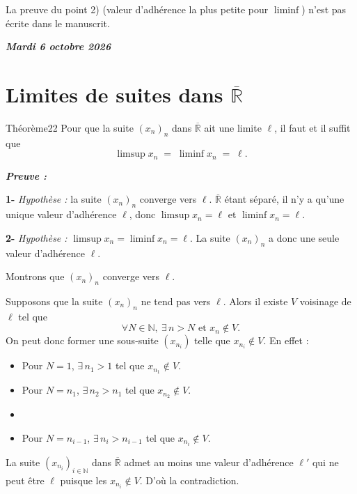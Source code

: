 \documentclass[11pt,a4paper]{article}
\newcommand{\N}{\mathbb{N}}
\newcommand{\Rb}{\overline{\mathbb{R}}}
\newenvironment{preuve}{\par\textit{\textbf{Preuve :}}\par\nopagebreak[4]}{\par}
\newcommand{\datepage}[1]{\begin{flushright}\small\bfseries\itshape\color{bleuclair}#1\end{flushright}\vspace{-8pt}}
\begin{document}
\begin{note}
La preuve du point 2) (valeur d'adhérence la plus petite pour $\liminf$) n'est pas écrite dans le manuscrit.
\end{note}


\datepage{Mardi 6 octobre 2026}
\section*{Limites de suites dans $\Rb$}

\begin{enonce}{Théorème}{22}
Pour que la suite $(x_n)_n$ dans $\Rb$ ait une limite $\ell$, il faut et il suffit que
\[
  \limsup x_n \;=\; \liminf x_n \;=\; \ell .
\]
\end{enonce}

\begin{preuve}\end{preuve}

\textbf{1-} \textit{Hypothèse :} la suite $(x_n)_n$ converge vers $\ell$.
$\Rb$ étant séparé, il n'y a qu'une unique valeur d'adhérence $\ell$,
donc $\limsup x_n=\ell$ et $\liminf x_n=\ell$.

\textbf{2-} \textit{Hypothèse :} $\limsup x_n=\liminf x_n=\ell$.
La suite $(x_n)_n$ a donc une seule valeur d'adhérence $\ell$.

Montrons que $(x_n)_n$ converge vers $\ell$.

Supposons que la suite $(x_n)_n$ ne tend pas vers $\ell$.
Alors il existe $V$ voisinage de $\ell$ tel que
\[
  \forall N\in\N,\ \exists\, n>N \text{ et } x_n\notin V .
\]
On peut donc former une sous-suite $(x_{n_i})$ telle que $x_{n_i}\notin V$. En effet :
\begin{itemize}[leftmargin=2cm,label={},itemsep=2pt]
  \item Pour $N=1$, $\exists\, n_1>1$ tel que $x_{n_1}\notin V$.
  \item Pour $N=n_1$, $\exists\, n_2>n_1$ tel que $x_{n_2}\notin V$.
  \item[\hspace{0.3cm}$\vdots$]
  \item Pour $N=n_{i-1}$, $\exists\, n_i>n_{i-1}$ tel que $x_{n_i}\notin V$.
\end{itemize}
La suite $(x_{n_i})_{i\in\N}$ dans $\Rb$ admet au moins une valeur d'adhérence $\ell'$
qui ne peut être $\ell$ puisque les $x_{n_i}\notin V$. D'où la contradiction.
\end{document}

